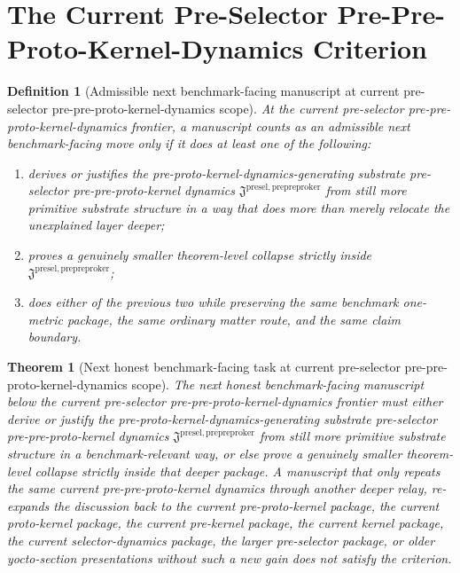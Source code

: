 \documentclass[11pt]{article}
\newcommand{\PrePreProtoKernelPackage}{\mathfrak J^{\mathrm{presel,prepreproker}}}
\newtheorem{definition}{Definition}
\newtheorem{theorem}{Theorem}
\begin{document}
\section{The Current Pre-Selector Pre-Pre-Proto-Kernel-Dynamics Criterion}

\begin{definition}[Admissible next benchmark-facing manuscript at current pre-selector pre-pre-proto-kernel-dynamics scope]
At the current pre-selector pre-pre-proto-kernel-dynamics frontier, a manuscript counts as an admissible next benchmark-facing move only if it does at least one of the following:
\begin{enumerate}
    \item derives or justifies the pre-proto-kernel-dynamics-generating substrate pre-selector pre-pre-proto-kernel dynamics \(\PrePreProtoKernelPackage\) from still more primitive substrate structure in a way that does more than merely relocate the unexplained layer deeper;
    \item proves a genuinely smaller theorem-level collapse strictly inside \(\PrePreProtoKernelPackage\);
    \item does either of the previous two while preserving the same benchmark one-metric package, the same ordinary matter route, and the same claim boundary.
\end{enumerate}
\end{definition}

\begin{theorem}[Next honest benchmark-facing task at current pre-selector pre-pre-proto-kernel-dynamics scope]
The next honest benchmark-facing manuscript below the current pre-selector pre-pre-proto-kernel-dynamics frontier must either derive or justify the pre-proto-kernel-dynamics-generating substrate pre-selector pre-pre-proto-kernel dynamics \(\PrePreProtoKernelPackage\) from still more primitive substrate structure in a benchmark-relevant way, or else prove a genuinely smaller theorem-level collapse strictly inside that deeper package. A manuscript that only repeats the same current pre-pre-proto-kernel dynamics through another deeper relay, re-expands the discussion back to the current pre-proto-kernel package, the current proto-kernel package, the current pre-kernel package, the current kernel package, the current selector-dynamics package, the larger pre-selector package, or older yocto-section presentations without such a new gain does not satisfy the criterion.
\end{theorem}
\end{document}
